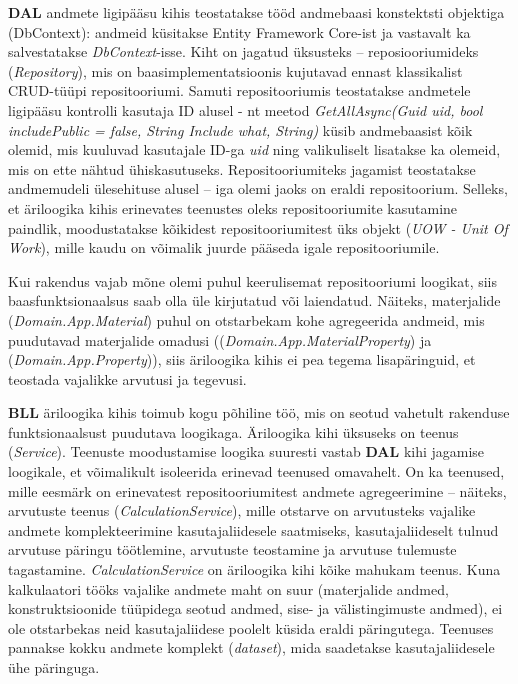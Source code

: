 \textbf{DAL} andmete ligipääsu kihis teostatakse tööd andmebaasi konstektsti objektiga (DbContext):  andmeid küsitakse Entity Framework Core-ist ja 
vastavalt ka salvestatakse \textit{DbContext}-isse. Kiht on jagatud üksusteks -- reposiooriumideks (\textit{Repository}), mis on 
baasimplementatsioonis kujutavad ennast klassikalist CRUD-tüüpi repositooriumi. Samuti repositooriumis 
teostatakse andmetele ligipääsu kontrolli kasutaja ID alusel -
nt meetod \textit{GetAllAsync(Guid uid, bool includePublic = false, String Include what, String)} küsib andmebaasist kõik olemid, 
mis kuuluvad kasutajale ID-ga \textit{uid} ning valikuliselt lisatakse ka olemeid, mis on ette nähtud ühiskasutuseks. 
Repositooriumiteks jagamist teostatakse andmemudeli ülesehituse alusel -- iga olemi jaoks on eraldi repositoorium. Selleks, et
äriloogika kihis erinevates teenustes oleks repositooriumite kasutamine paindlik, moodustatakse kõikidest repositooriumitest üks
objekt (\textit{UOW - Unit Of Work}), mille kaudu on võimalik juurde pääseda igale repositooriumile.

Kui rakendus vajab mõne olemi puhul keerulisemat repositooriumi loogikat, siis baasfunktsionaalsus saab olla üle kirjutatud
või laiendatud. Näiteks, materjalide (\textit{Domain.App.Material}) puhul on otstarbekam kohe agregeerida andmeid, 
mis puudutavad materjalide omadusi ((\textit{Domain.App.MaterialProperty}) ja (\textit{Domain.App.Property})), siis
äriloogika kihis ei pea tegema lisapäringuid, et teostada vajalikke arvutusi ja tegevusi.


\textbf{BLL} äriloogika kihis toimub kogu põhiline töö, mis on seotud vahetult rakenduse funktsionaalsust puudutava loogikaga.
Äriloogika kihi üksuseks on teenus (\textit{Service}). Teenuste moodustamise loogika suuresti vastab \textbf{DAL} kihi jagamise loogikale,
et võimalikult isoleerida erinevad teenused omavahelt. On ka teenused, mille eesmärk on erinevatest repositooriumitest andmete agregeerimine --
näiteks, arvutuste teenus (\textit{CalculationService}), mille otstarve on arvutusteks vajalike andmete komplekteerimine kasutajaliidesele
saatmiseks, kasutajaliideselt tulnud arvutuse päringu töötlemine, arvutuste teostamine ja arvutuse tulemuste tagastamine.
\textit{CalculationService} on äriloogika kihi kõike mahukam teenus. Kuna kalkulaatori tööks vajalike andmete maht on suur (materjalide
andmed, konstruktsioonide tüüpidega seotud andmed, sise- ja välistingimuste andmed), ei ole otstarbekas
neid kasutajaliidese poolelt küsida eraldi päringutega. Teenuses pannakse kokku andmete komplekt (\textit{dataset}), mida saadetakse
kasutajaliidesele ühe päringuga.





